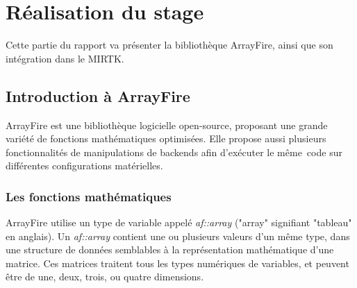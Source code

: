 \documentclass[10pt]{report}
\begin{document}
\chapter{Réalisation du stage} 

Cette partie du rapport va présenter la bibliothèque ArrayFire, ainsi que son intégration dans le MIRTK.
	\section{Introduction à ArrayFire}
	ArrayFire est une bibliothèque logicielle open-source, proposant une grande variété de fonctions mathématiques optimisées. Elle propose aussi plusieurs fonctionnalités de manipulations de backends afin d'exécuter le même code sur différentes configurations matérielles.
	\subsection{Les fonctions mathématiques}
	ArrayFire utilise un type de variable appelé \textit{af::array} ("array" signifiant "tableau" en anglais). Un \textit{af::array} contient une ou plusieurs valeurs d'un même type, dans une structure de données semblables à la représentation mathématique d'une matrice. Ces matrices traitent tous les types numériques de variables, et peuvent être de une, deux, trois, ou quatre dimensions. ~\par 
	
\end{document}
